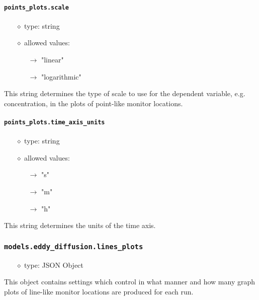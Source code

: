 \documentclass[]{article}
\def\code#1{\texttt{#1}}
\begin{document}
\paragraph{\code{points\_plots.scale}}
\begin{itemize}
    \item[$\diamond$] type: string 
    \item[$\diamond$] allowed values:
    \begin{itemize}
        \item[$\rightarrow$] "linear"
        \item[$\rightarrow$] "logarithmic"
    \end{itemize}
\end{itemize}
This string determines the type of scale to use for the dependent variable, e.g.
concentration, in the plots of point-like monitor locations.

\paragraph{\code{points\_plots.time\_axis\_units}}
\begin{itemize}
    \item[$\diamond$] type: string 
    \item[$\diamond$] allowed values:
    \begin{itemize}
        \item[$\rightarrow$] "s"
        \item[$\rightarrow$] "m"
        \item[$\rightarrow$] "h"
    \end{itemize}
\end{itemize}
This string determines the units of the time axis.

\subsubsection{\code{models.eddy\_diffusion.lines\_plots}}
\begin{itemize}
    \item[$\diamond$] type: JSON Object 
\end{itemize}
This object contains settings which control in what manner and how many graph
plots of line-like monitor locations are produced for each run. 
\end{document}
